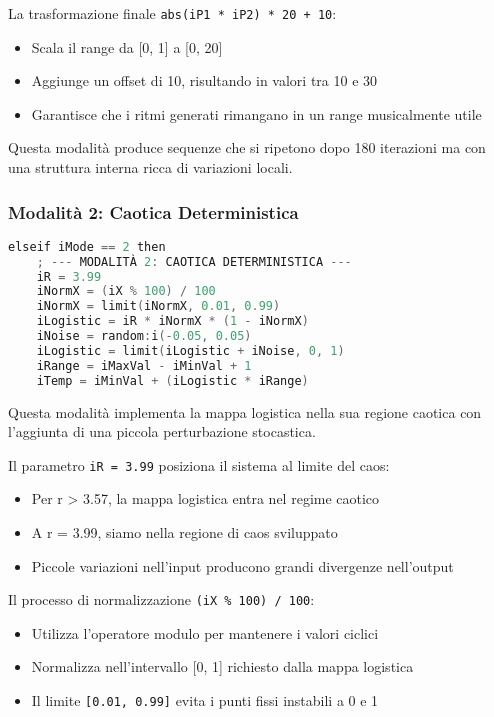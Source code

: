 La trasformazione finale \texttt{abs(iP1 * iP2) * 20 + 10}:
\begin{itemize}
 \item Scala il range da [0, 1] a [0, 20]
 \item Aggiunge un offset di 10, risultando in valori tra 10 e 30
 \item Garantisce che i ritmi generati rimangano in un range musicalmente utile
\end{itemize}

Questa modalità produce sequenze che si ripetono dopo 180 iterazioni ma con una struttura interna ricca di variazioni locali.
\subsubsection{Modalità 2: Caotica Deterministica}
\begin{lstlisting}[language=C]
elseif iMode == 2 then
    ; --- MODALITÀ 2: CAOTICA DETERMINISTICA ---
    iR = 3.99
    iNormX = (iX % 100) / 100
    iNormX = limit(iNormX, 0.01, 0.99)
    iLogistic = iR * iNormX * (1 - iNormX)
    iNoise = random:i(-0.05, 0.05)
    iLogistic = limit(iLogistic + iNoise, 0, 1)
    iRange = iMaxVal - iMinVal + 1
    iTemp = iMinVal + (iLogistic * iRange)
\end{lstlisting}

Questa modalità implementa la mappa logistica nella sua regione caotica con l'aggiunta di una piccola perturbazione stocastica.

Il parametro \texttt{iR = 3.99} posiziona il sistema al limite del caos:
\begin{itemize}
 \item Per r > 3.57, la mappa logistica entra nel regime caotico
 \item A r = 3.99, siamo nella regione di caos sviluppato
 \item Piccole variazioni nell'input producono grandi divergenze nell'output
\end{itemize}

Il processo di normalizzazione \texttt{(iX \% 100) / 100}:
\begin{itemize}
 \item Utilizza l'operatore modulo per mantenere i valori ciclici
 \item Normalizza nell'intervallo [0, 1] richiesto dalla mappa logistica
 \item Il limite \texttt{[0.01, 0.99]} evita i punti fissi instabili a 0 e 1
\end{itemize}

